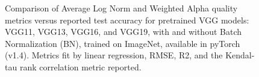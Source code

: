 \begin{figure}[t]
    \centering
    \qquad
    \qquad
    \qquad
    \caption{Comparison of Average Log Norm and Weighted Alpha quality metrics versus reported test accuracy for pretrained VGG models: 
             VGG11, VGG13, VGG16, and VGG19, with and without Batch Normalization (BN),
             trained on ImageNet, available in pyTorch (v1.4).  
             Metrics fit by linear regression, RMSE, R2, and the Kendal-tau rank correlation metric reported.  
            }
    \label{fig:vgg-metrics}
\end{figure}


